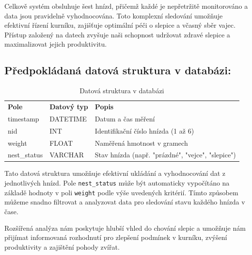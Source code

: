 Celkově systém obsluhuje šest hnízd, přičemž každé je nepřetržitě monitorováno a data jsou pravidelně vyhodnocována. Toto komplexní sledování umožňuje efektivní řízení kurníku, zajišťuje optimální péči o slepice a včasný sběr vajec. Přístup založený na datech zvyšuje naši schopnost udržovat zdravé slepice a maximalizovat jejich produktivitu.

\subsection*{Předpokládaná datová struktura v databázi:}

\begin{table}[h!]
\centering
\begin{tabular}{lll}
\textbf{Pole} & \textbf{Datový typ} & \textbf{Popis} \\
timestamp & DATETIME & Datum a čas měření \\
nid & INT & Identifikační číslo hnízda (1 až 6) \\
weight & FLOAT & Naměřená hmotnost v gramech \\
nest\_status & VARCHAR & Stav hnízda (např. "prázdné", "vejce", "slepice") \\
\end{tabular}
\caption{Datová struktura v databázi}
\end{table}

Tato datová struktura umožňuje efektivní ukládání a vyhodnocování dat z jednotlivých hnízd. Pole \texttt{nest\_status} může být automaticky vypočítáno na základě hodnoty v poli \texttt{weight} podle výše uvedených kritérií. Tímto způsobem můžeme snadno filtrovat a analyzovat data pro sledování stavu každého hnízda v čase.

Rozšířená analýza nám poskytuje hlubší vhled do chování slepic a umožňuje nám přijímat informovaná rozhodnutí pro zlepšení podmínek v kurníku, zvýšení produktivity a zajištění pohody zvířat.
